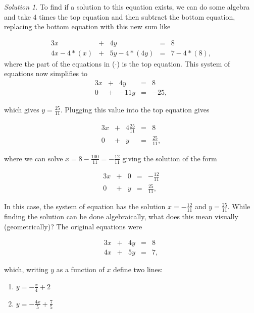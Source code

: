 \documentclass[
]{book}
\providecommand{\tightlist}{%
  \setlength{\itemsep}{0pt}\setlength{\parskip}{0pt}}
\theoremstyle{definition}
\theoremstyle{definition}
\theoremstyle{definition}
\theoremstyle{definition}
\theoremstyle{remark}
\newtheorem*{solution}{Solution}
\begin{document}
\begin{solution}
To find if a solution to this equation exists, we can do some algebra and take 4 times the top equation and then subtract the bottom equation, replacing the bottom equation with this new sum like

\begin{alignat*}{3}
x   & {}+{} & 4 y & {}={} & 8 \\
4 x - 4 * (x) & {}+{} & 5 y - 4 * (4y) & {}={} & 7 - 4 * (8),
\end{alignat*}
where the part of the equations in (\(\cdot\)) is the top equation. This system of equations now simplifies to
\begin{alignat*}{3}
x & {}+{} & 4 y & {}={} & 8 \\
0 & {}+{} & - 11y & {}={} & -25,
\end{alignat*}

which gives \(y = \frac{25}{11}\). Plugging this value into the top equation gives

\begin{alignat*}{3}
x & {}+{} & 4 \frac{25}{11} & {}={} & 8 \\
0 & {}+{} & y & {}={} & \frac{25}{11},
\end{alignat*}

where we can solve \(x = 8 - \frac{100}{11} = -\frac{12}{11}\) giving the solution of the form

\begin{alignat*}{3}
x & {}+{} & 0 & {}={} & -\frac{12}{11} \\
0 & {}+{} & y & {}={} & \frac{25}{11},
\end{alignat*}

In this case, the system of equation has the solution \(x = -\frac{12}{11}\) and \(y = \frac{25}{11}\). While finding the solution can be done algebraically, what does this mean visually (geometrically)? The original equations were

\begin{alignat*}{3}
x   & {}+{} & 4 y & {}={} & 8 \\
4 x & {}+{} & 5 y & {}={} & 7,
\end{alignat*}

which, writing \(y\) as a function of \(x\) define two lines:

\begin{enumerate}
\def\labelenumi{\arabic{enumi})}
\tightlist
\item
  \(y = -\frac{x}{4} + 2\)
\item
  \(y = -\frac{4x}{5} + \frac{7}{5}\)
\end{enumerate}


\end{solution}
\end{document}

